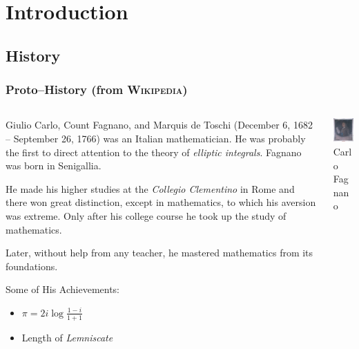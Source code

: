 \documentclass[10pt,handout]{beamer} %
\date{July 22, 2013}
\title[Elliptic curves over $\F_{q}$]{\insertlecture}
\subtitle{First steps}
\begin{document}
\begin{frame}
\titlepage
\end{frame}

\section{Introduction}


\subsection{History}

\begin{frame}\frametitle{Proto--History (from \textsc{Wikipedia})}

\begin{columns}[c]
\begin{column}{6cm}\begin{small}
Giulio Carlo, Count Fagnano, and Marquis de Toschi (December 6, 1682 -- September 26, 1766)
was an Italian mathematician. He was probably the first to direct attention to the theory of
\emph{elliptic integrals}. Fagnano was born in Senigallia.\medskip

He made his higher studies at the \emph{Collegio Clementino} in Rome and there won great distinction,
except in mathematics, to which his aversion was extreme. Only after his college course he took up the study of
mathematics.\medskip

Later, without help from any teacher, he mastered mathematics from its foundations.\end{small}
\begin{block}{Some of His Achievements:}
\begin{itemize}
 \item $\pi=2i\log\frac{1-i}{1+1}$
 \item Length of \emph{Lemniscate}
\end{itemize}
\end{block}
\end{column}
\begin{column}{4cm}
\includegraphics[width=2.5cm]{images/fagnano.jpg}\\
\scriptsize{Carlo Fagnano}
\bigskip


\end{column}
\end{columns}
\end{frame}
\end{document}
